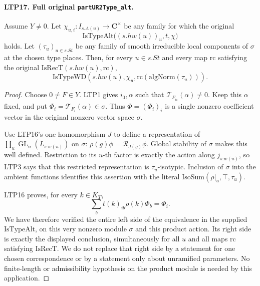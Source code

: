 \paragraph{LTP17. Full original \texttt{partUR2Type\_alt}.}
\label{claim:LTP17}
Assume \(Y\ne0\).  Let
\(\chi_{u,i}:I_{s.A(u)}\to\mathbf C^\times\) be any family
for which the original
\[
      \mathrm{IsTypeAlt}\bigl((s.hw(u))_u,t,\chi\bigr)
\]
holds.  Let \((\tau_u)_{u\in s.St}\) be any family of smooth
irreducible local components of \(\sigma\) at the chosen type
places.  Then, for every \(u\in s.St\) and every map
\(\mathrm{rc}\) satisfying the original
\(\mathrm{IsRecT}(s.hw(u),\mathrm{rc})\),
\[
        \mathrm{IsTypeWD}\!
          \left(s.hw(u),\chi_u,
                         \mathrm{rc}(\mathrm{algNorm}(\tau_u))\right).
\]
\begin{proof}
Choose \(0\ne F\in Y\).  LTP1 gives \(i_0,\alpha\) such that
\(\mathcal T_{F_{i_0}}(\alpha)\ne0\).  Keep this \(\alpha\)
fixed, and put
\(\Phi_i=\mathcal T_{F_i}(\alpha)\in\sigma\).
Thus \(\Phi=(\Phi_i)_i\) is a single nonzero coefficient vector
in the original nonzero vector space \(\sigma\).

Use LTP16's one homomorphism \(J\) to define a representation
of \(\prod_u\operatorname{GL}_n(L_{s.w(u)})\) on \(\sigma\):
\(\rho(g)\phi=\mathscr R_{J(g)}\phi\).
Global stability of \(\sigma\) makes this well defined.
Restriction to its \(u\)-th factor is exactly the action along
\(j_{s.w(u)}\), so LTP3 says that this restricted representation
is \(\tau_u\)-isotypic.  Inclusion of \(\sigma\) into the ambient
functions identifies this assertion with the literal
\(\mathrm{IsoSum}(\rho|_u,\top,\tau_u)\).

LTP16 proves, for every \(k\in K_T\),
\[
                   \sum_b t(k)_{ib}\rho(k)\Phi_b=\Phi_i .
\]
We have therefore verified the entire left side of the equivalence
in the supplied \(\mathrm{IsTypeAlt}\), on this very nonzero
module \(\sigma\) and this product action.  Its right side is
exactly the displayed conclusion, simultaneously for all \(u\)
and all maps \(\mathrm{rc}\) satisfying \(\mathrm{IsRecT}\).
We do not replace that right side by a statement for one chosen
correspondence or by a statement only about unramified parameters.
No finite-length or admissibility hypothesis on the product
module is needed by this application.
\end{proof}

